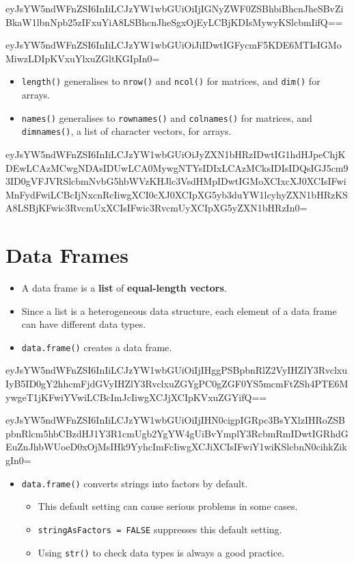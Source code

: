\documentclass[]{book}
\providecommand{\tightlist}{%
  \setlength{\itemsep}{0pt}\setlength{\parskip}{0pt}}
\begin{document}
eyJsYW5ndWFnZSI6InIiLCJzYW1wbGUiOiIjIGNyZWF0ZSBhbiBhcnJheSBvZiBkaW1lbnNpb25zIFxuYiA8LSBhcnJheSgxOjEyLCBjKDIsMywyKSlcbmIifQ==

eyJsYW5ndWFnZSI6InIiLCJzYW1wbGUiOiJiIDwtIGFycmF5KDE6MTIsIGMoMiwzLDIpKVxuYlxuZGltKGIpIn0=

\begin{itemize}
\tightlist
\item
  \texttt{length()} generalises to \texttt{nrow()} and \texttt{ncol()} for matrices, and \texttt{dim()} for arrays.
\item
  \texttt{names()} generalises to \texttt{rownames()} and \texttt{colnames()} for matrices, and \texttt{dimnames()}, a list of character vectors, for arrays.
\end{itemize}

eyJsYW5ndWFnZSI6InIiLCJzYW1wbGUiOiJyZXN1bHRzIDwtIG1hdHJpeChjKDEwLCAzMCwgNDAsIDUwLCA0MywgNTYsIDIxLCAzMCksIDIsIDQsIGJ5cm93ID0gVFJVRSlcbmNvbG5hbWVzKHJlc3VsdHMpIDwtIGMoXCIxcXJ0XCIsIFwiMnFydFwiLCBcIjNxcnRcIiwgXCI0cXJ0XCIpXG5yb3duYW1lcyhyZXN1bHRzKSA8LSBjKFwic3RvcmUxXCIsIFwic3RvcmUyXCIpXG5yZXN1bHRzIn0=

\hypertarget{data-frames-2}{%
\section{Data Frames}\label{data-frames-2}}

\begin{itemize}
\tightlist
\item
  A data frame is a \textbf{list} of \textbf{equal-length vectors}.
\item
  Since a list is a heterogeneous data structure, each element of a data frame can have different data types.\\
\item
  \texttt{data.frame()} creates a data frame.
\end{itemize}

eyJsYW5ndWFnZSI6InIiLCJzYW1wbGUiOiIjIHggPSBpbnRlZ2VyIHZlY3RvclxuIyB5ID0gY2hhcmFjdGVyIHZlY3RvclxuZGYgPC0gZGF0YS5mcmFtZSh4PTE6MywgeT1jKFwiYVwiLCBcImJcIiwgXCJjXCIpKVxuZGYifQ==

eyJsYW5ndWFnZSI6InIiLCJzYW1wbGUiOiIjIHN0cigpIGRpc3BsYXlzIHRoZSBpbnRlcm5hbCBzdHJ1Y3R1cmUgb2YgYW4gUiBvYmplY3RcbmRmIDwtIGRhdGEuZnJhbWUoeD0xOjMsIHk9YyhcImFcIiwgXCJiXCIsIFwiY1wiKSlcbnN0cihkZikgIn0=

\begin{itemize}
\tightlist
\item
  \texttt{data.frame()} converts strings into factors by default.

  \begin{itemize}
  \tightlist
  \item
    This default setting can cause serious problems in some cases.
  \item
    \texttt{stringAsFactors\ =\ FALSE} suppresses this default setting.
  \item
    Using \texttt{str()} to check data types is always a good practice.
  \end{itemize}
\end{itemize}
\end{document}
